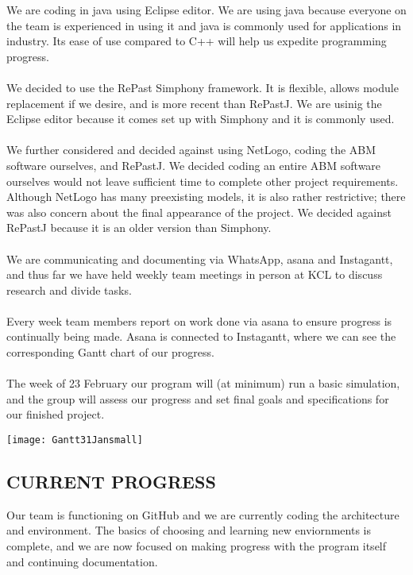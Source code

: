 \documentclass[11pt]{article}
\begin{document}
We are coding in java using Eclipse editor. We are using java because everyone 
on the team is experienced in using it and java is commonly used for applications in industry. 
Its ease of use compared to C++ will help us expedite programming progress.
\\ \\
We decided to use the RePast Simphony framework. It is flexible, allows 
module replacement if we desire, and is more recent than RePastJ. We are usinig the Eclipse 
editor because it comes set up with Simphony and it is commonly used.
\\ \\
We further considered and decided against using NetLogo, coding the ABM software ourselves, and RePastJ. 
We decided coding an entire ABM software ourselves would not leave sufficient time to 
complete other project requirements. Although NetLogo has many preexisting models, it is 
also rather restrictive; there was also concern about the final appearance of the project.
We decided against RePastJ because it is an older version than Simphony.
\\ \\
We are communicating and documenting via WhatsApp, asana and Instagantt, and thus 
far we have held weekly team meetings in person at KCL to discuss research and divide tasks.
\\ \\
Every week team members report on work done via asana to ensure progress is continually 
being made. Asana is connected to Instagantt, where we can see the corresponding Gantt
chart of our progress.
\\ \\
The week of 23 February our program will (at minimum) run a basic simulation, and the 
group will assess our progress and set final goals and specifications for our finished 
project.

 
\texttt{[image: Gantt31Jansmall]}



\subsection*{CURRENT PROGRESS}

Our team is functioning on GitHub and we are currently coding the architecture and 
environment. The basics of choosing and learning new enviornments is complete, and we
are now focused on making progress with the program itself and continuing documentation.
 
\end{document}
